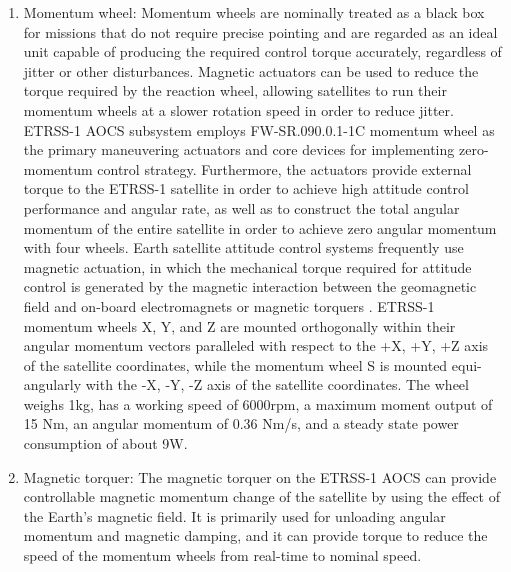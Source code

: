 \documentclass[final,5p,times,twocolumn]{elsarticle}
\begin{document}
\begin{enumerate}
	\item Momentum wheel: Momentum wheels are nominally treated as a black box for missions that do not require precise pointing \cite{Wang2019AdaptiveMD} and are regarded as an ideal unit capable of producing the required control torque accurately, regardless of jitter or other disturbances.  Magnetic actuators can be used to reduce the torque required by the reaction wheel, allowing satellites to run their momentum wheels at a slower rotation speed in order to reduce jitter. ETRSS-1 AOCS subsystem employs FW-SR.090.0.1-1C momentum wheel as the primary maneuvering actuators and core devices for implementing zero-momentum control strategy. Furthermore, the actuators provide external torque to the ETRSS-1 satellite in order to achieve high attitude control performance and angular rate, as well as to construct the total angular momentum of the entire satellite in order to achieve zero angular momentum with four wheels. Earth satellite attitude control systems frequently use magnetic actuation, in which the mechanical torque required for attitude control is generated by the magnetic interaction between the geomagnetic field and on-board electromagnets or magnetic torquers \cite{Bhat2003ControllabilityOS}. ETRSS-1 momentum wheels X, Y, and Z are mounted orthogonally within their angular momentum vectors paralleled with respect to the +X, +Y, +Z axis of the satellite coordinates, while the momentum wheel S is mounted equi-angularly with the -X, -Y, -Z axis of the satellite coordinates. The wheel weighs 1kg, has a working speed of 6000rpm, a maximum moment output of 15 Nm, an angular momentum of 0.36 Nm/s, and a steady state power consumption of about 9W.
	\item Magnetic torquer: The magnetic torquer on the ETRSS-1 AOCS can provide controllable magnetic momentum change of the satellite by using the effect of the Earth's magnetic field. It is primarily used for unloading angular momentum and magnetic damping, and it can provide torque to reduce the speed of the momentum wheels from real-time to nominal speed. 
\end{enumerate}
\end{document}
